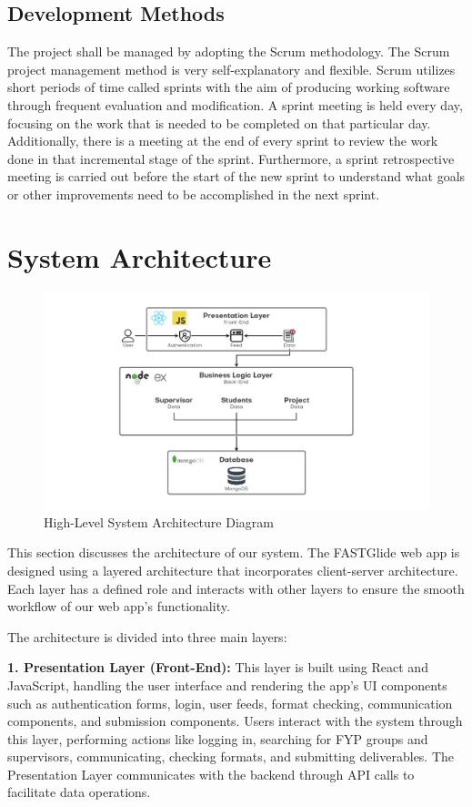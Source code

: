 \documentclass{FastFyp}
\begin{document}
\subsection{Development Methods}
The project shall be managed by adopting the Scrum methodology. The Scrum project management method is very self-explanatory and flexible. Scrum utilizes short periods of time called sprints with the aim of producing working software through frequent evaluation and modification. A sprint meeting is held every day, focusing on the work that is needed to be completed on that particular day. Additionally, there is a meeting at the end of every sprint to review the work done in that incremental stage of the sprint. Furthermore, a sprint retrospective meeting is carried out before the start of the new sprint to understand what goals or other improvements need to be accomplished in the next sprint.

\section{System Architecture}

\begin{figure}[!h]
    \centering
    \includegraphics[width=\textwidth]{Figures/Arch}
    \caption{High-Level System Architecture Diagram}
\end{figure}

This section discusses the architecture of our system. The FASTGlide web app is designed using a layered architecture that incorporates client-server architecture. Each layer has a defined role and interacts with other layers to ensure the smooth workflow of our web app's functionality. 

The architecture is divided into three main layers:

\textbf{1. Presentation Layer (Front-End):} This layer is built using React and JavaScript, handling the user interface and rendering the app’s UI components such as authentication forms, login, user feeds, format checking, communication components, and submission components. Users interact with the system through this layer, performing actions like logging in, searching for FYP groups and supervisors, communicating, checking formats, and submitting deliverables. The Presentation Layer communicates with the backend through API calls to facilitate data operations.
\end{document}
